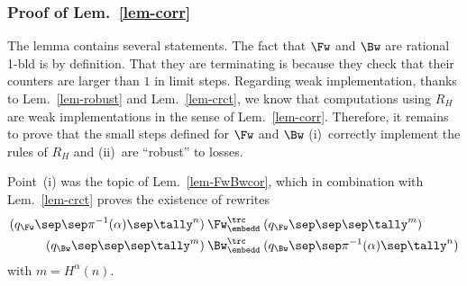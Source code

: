 \subsubsection{Proof of Lem.~\ref{lem-corr}}  The lemma contains
several statements.  The fact that $\Fw$ and $\Bw$ are rational 1-bld
is by definition.  That they are terminating is because they check
that their counters are larger than $1$ in limit steps.
Regarding weak implementation, thanks to
Lem.~\ref{lem-robust} and Lem.~\ref{lem-crct}, we know that
computations using $R_H$ are weak implementations in the sense of
Lem.~\ref{lem-corr}.  Therefore, it remains to prove that the small steps
defined for $\Fw$ and $\Bw$ (i)~correctly implement the rules of
$R_H$ and (ii)~are ``robust'' to losses.

Point~(i) was the topic of Lem.~\ref{lem-FwBwcor}, which in
combination with Lem.~\ref{lem-crct} proves the existence of rewrites 
\begin{align}
  (q_\Fw\sep\sep\pi^{-1}(\alpha)\sep\tally^n)\:&\Fw_\embedd^\trc\:(q_\Fw\sep\sep\sep\tally^m)\label{eq-Fw}\\
  (q_\Bw\sep\sep\sep\tally^m)\:&\Bw_\embedd^\trc\:(q_\Bw\sep\sep\pi^{-1}(\alpha)\sep\tally^n)\label{eq-Bw}
\end{align}
with $m=H^\alpha(n)$.

